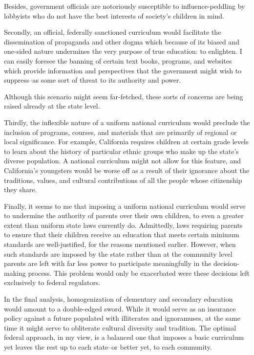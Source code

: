 Besides, government officials are notoriously susceptible to influence-peddling by lobbyists who do not have the best interests of society's children in mind.


Secondly, an official, federally sanctioned curriculum would facilitate the dissemination of propaganda and other dogma which because of its biased and one-sided nature undermines the very purpose of true education: to enlighten.
I can easily foresee the banning of certain text books, programs, and websites which provide information and perspectives that the government might wish to suppress--as some sort of threat to its authority and power.


Although this scenario might seem far-fetched, these sorts of concerns are being raised already at the state level.


Thirdly, the inflexible nature of a uniform national curriculum would preclude the inclusion of programs, courses, and materials that are primarily of regional or local significance.
For example, California requires children at certain grade levels to learn about the history of particular ethnic groups who make up the state's diverse population.
A national curriculum might not allow for this feature, and California's youngsters would be worse off as a result of their ignorance about the traditions, values, and cultural contributions of all the people whose citizenship they share.


Finally, it seems to me that imposing a uniform national curriculum would serve to undermine the authority of parents over their own children, to even a greater extent than uniform state laws currently do.
Admittedly, laws requiring parents to ensure that their children receive an education that meets certain minimum standards are well-justified, for the reasons mentioned earlier.
However, when such standards are imposed by the state rather than at the community level parents are left with far less power to participate meaningfully in the decision-making process.
This problem would only be exacerbated were these decisions left exclusively to federal regulators.


In the final analysis, homogenization of elementary and secondary education would amount to a double-edged sword.
While it would serve as an insurance policy against a future populated with illiterates and ignoramuses, at the same time it might serve to obliterate cultural diversity and tradition.
The optimal federal approach, in my view, is a balanced one that imposes a basic curriculum yet leaves the rest up to each state--or better yet, to each community.
